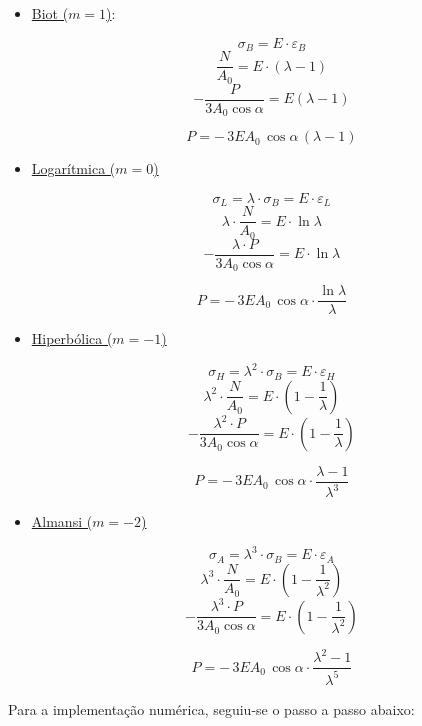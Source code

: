 \begin{textocaixa}
\begin{itemize}
	\item[b)] \underline{Biot ($m = 1$)}:
	
	$$\sigma_B = E\cdot\varepsilon_B$$
	$$\frac{N}{A_0} = E\cdot \left(\lambda - 1\right)$$
	$$-\frac{P}{3A_0\cos\alpha} = E\left(\lambda - 1\right)$$

	\begin{equation}
		\boxed{P = -\,3EA_0\,\cos\alpha\,\left(\lambda - 1\right)}
		\label{eq:TP8-P_Biot}
	\end{equation}
	
	\item[c)] \underline{Logarítmica ($m = 0$)}
	
	$$\sigma_L = \lambda\cdot\sigma_B = E\cdot\varepsilon_L$$
	$$\lambda\cdot\frac{N}{A_0} = E\cdot\ln\lambda$$
	$$-\frac{\lambda\cdot P}{3A_0\cos\alpha} = E\cdot\ln\lambda$$

	\begin{equation}
		\boxed{P = -\,3EA_0\,\cos\alpha\cdot\frac{\ln\lambda}{\lambda}}
		\label{eq:TP8-P_Logaritmica}
	\end{equation}
	
	\item[d)] \underline{Hiperbólica ($m = -1$)}
	
	$$\sigma_H = \lambda^2\cdot\sigma_B = E\cdot\varepsilon_H$$
	$$\lambda^2\cdot\frac{N}{A_0} = E\cdot\left(1 - \frac{1}{\lambda}\right)$$
	$$-\frac{\lambda^2\cdot P}{3A_0\cos\alpha} = E\cdot\left(1 - \frac{1}{\lambda}\right)$$

	\begin{equation}
		\boxed{P = -\,3EA_0\,\cos\alpha\cdot\frac{\lambda - 1}{\lambda^3}}
		\label{eq:TP8-P_Hiperbolica}
	\end{equation}
	
	\item[e)] \underline{Almansi ($m = -2$)}
	
	$$\sigma_A = \lambda^3\cdot\sigma_B = E\cdot\varepsilon_A$$
	$$\lambda^3\cdot\frac{N}{A_0} = E\cdot\left(1 - \frac{1}{\lambda^2}\right)$$
	$$-\frac{\lambda^3\cdot P}{3A_0\cos\alpha} = E\cdot\left(1 - \frac{1}{\lambda^2}\right)$$

	\begin{equation}
		\boxed{P = -\,3EA_0\,\cos\alpha\cdot\frac{\lambda^2 - 1}{\lambda^5}}
		\label{eq:TP8-P_Almansi}
	\end{equation}

\end{itemize}

Para a implementação numérica, seguiu-se o passo a passo abaixo:


\end{textocaixa}
